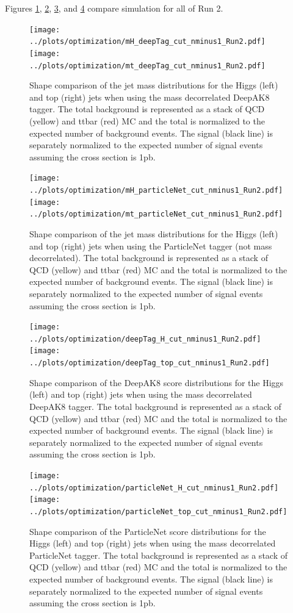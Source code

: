 \documentclass[10pt,oneside]{article}
\begin{document}
Figures \ref{figs:jetMassDAK8}, \ref{figs:jetMassPN}, \ref{figs:jetDAK8}, and \ref{figs:jetPN}
compare simulation for all of Run 2.

\begin{figure}[H]
    \texttt{[image: ../plots/optimization/mH\_deepTag\_cut\_nminus1\_Run2.pdf]}
    \texttt{[image: ../plots/optimization/mt\_deepTag\_cut\_nminus1\_Run2.pdf]}
    \caption{Shape comparison of the jet mass distributions for the Higgs (left) and top (right) jets
    when using the mass decorrelated DeepAK8 tagger. The total background
    is represented as a stack of QCD (yellow) and ttbar (red) MC and the total is normalized to
    the expected number of background events. The signal (black line) is separately normalized to the expected
    number of signal events assuming the cross section is 1pb.}
    \label{figs:jetMassDAK8}
\end{figure}

\begin{figure}[H]
    \texttt{[image: ../plots/optimization/mH\_particleNet\_cut\_nminus1\_Run2.pdf]}
    \texttt{[image: ../plots/optimization/mt\_particleNet\_cut\_nminus1\_Run2.pdf]}
    \caption{Shape comparison of the jet mass distributions for the Higgs (left) and top (right) jets
    when using the ParticleNet tagger (not mass decorrelated). The total background
    is represented as a stack of QCD (yellow) and ttbar (red) MC and the total is normalized to
    the expected number of background events. The signal (black line) is separately normalized to the expected
    number of signal events assuming the cross section is 1pb.}
    \label{figs:jetMassPN}
\end{figure}

\begin{figure}[H]
    \texttt{[image: ../plots/optimization/deepTag\_H\_cut\_nminus1\_Run2.pdf]}
    \texttt{[image: ../plots/optimization/deepTag\_top\_cut\_nminus1\_Run2.pdf]}
    \caption{Shape comparison of the DeepAK8 score distributions for the Higgs (left) and top (right) jets
    when using the mass decorrelated DeepAK8 tagger. The total background
    is represented as a stack of QCD (yellow) and ttbar (red) MC and the total is normalized to
    the expected number of background events. The signal (black line) is separately normalized to the expected
    number of signal events assuming the cross section is 1pb.}
    \label{figs:jetDAK8}
\end{figure}

\begin{figure}[H]
    \texttt{[image: ../plots/optimization/particleNet\_H\_cut\_nminus1\_Run2.pdf]}
    \texttt{[image: ../plots/optimization/particleNet\_top\_cut\_nminus1\_Run2.pdf]}
    \caption{Shape comparison of the ParticleNet score distributions for the Higgs (left) and top (right) jets
    when using the mass decorrelated ParticleNet tagger. The total background
    is represented as a stack of QCD (yellow) and ttbar (red) MC and the total is normalized to
    the expected number of background events. The signal (black line) is separately normalized to the expected
    number of signal events assuming the cross section is 1pb.}
    \label{figs:jetPN}
\end{figure}
\end{document}
